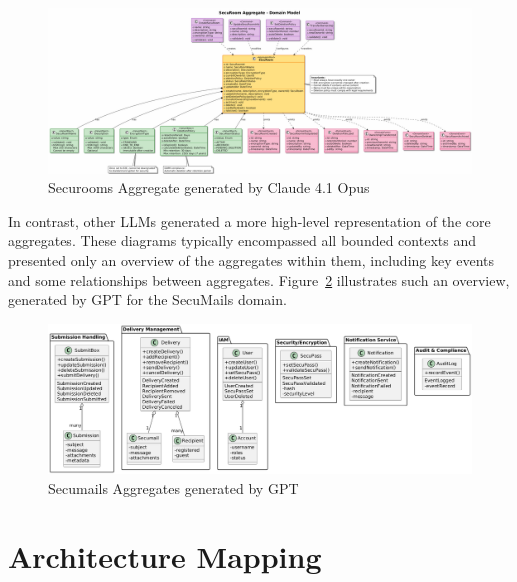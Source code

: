 \begin{figure}[htbp]
  \centering
  \begin{adjustbox}{max width=\textwidth}
      \includegraphics{figures/securoom-aggregate-claude.png} 
  \end{adjustbox}
  \caption{Securooms Aggregate generated by Claude 4.1 Opus}
  \label{fig:securooms-aggregate-claude} 
\end{figure}

In contrast, other LLMs generated a more high-level representation of the core aggregates. These diagrams typically encompassed all bounded contexts and presented only an overview of the aggregates within them, including key events and some relationships between aggregates. Figure~\ref{fig:secumails-aggregates-gpt} illustrates such an overview, generated by GPT for the SecuMails domain.  

\begin{figure}[htbp]
  \centering
  \begin{adjustbox}{max width=\textwidth}
      \includegraphics{figures/secumails-aggregates-gpt.png} 
  \end{adjustbox}
  \caption{Secumails Aggregates generated by GPT}
  \label{fig:secumails-aggregates-gpt} 
\end{figure}


\section{Architecture Mapping}

